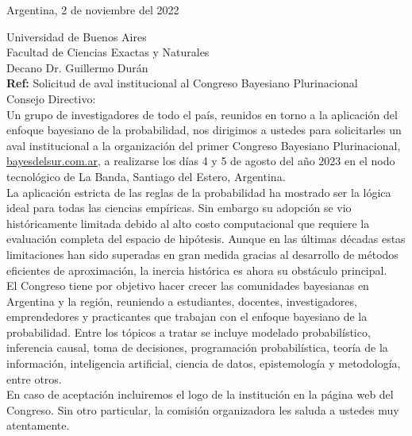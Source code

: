 \documentclass[a4paper,11pt]{article}
\begin{document}
\begin{flushright}
Argentina, 2 de noviembre del 2022
\end{flushright} 

\vspace{0.1cm}
\noindent
Universidad de Buenos Aires \\
Facultad de Ciencias Exactas y Naturales \\
Decano Dr. Guillermo Durán\\[-0.1cm]

\hfill \textbf{Ref:} Solicitud de aval institucional al Congreso Bayesiano Plurinacional \\

\vspace{0.3cm} \noindent Consejo Directivo:\\

\indent Un grupo de investigadores de todo el país, reunidos en torno a la aplicación del enfoque bayesiano de la probabilidad, nos dirigimos a ustedes para solicitarles un aval institucional a la organización del primer Congreso Bayesiano Plurinacional, \url{bayesdelsur.com.ar}, a realizarse los días 4 y 5 de agosto del año 2023 en el nodo tecnológico de La Banda, Santiago del Estero, Argentina. \\

\indent La aplicación estricta de las reglas de la probabilidad ha mostrado ser la lógica ideal para todas las ciencias empíricas.
Sin embargo su adopción se vio históricamente limitada debido al alto costo computacional que requiere la evaluación completa del espacio de hipótesis.
Aunque en las últimas décadas estas limitaciones han sido superadas en gran medida gracias al desarrollo de métodos eficientes de aproximación, la inercia histórica es ahora su obstáculo principal. \\

\indent  El Congreso tiene por objetivo hacer crecer las comunidades bayesianas en Argentina y la región, reuniendo a estudiantes, docentes, investigadores, emprendedores y practicantes que trabajan con el enfoque bayesiano de la probabilidad. Entre los tópicos a tratar se incluye modelado probabilístico, inferencia causal, toma de decisiones, programación probabilística, teoría de la información, inteligencia artificial, ciencia de datos, epistemología y metodología, entre otros. \\

\indent En caso de aceptación incluiremos el logo de la institución en la página web del Congreso. Sin otro particular, la comisión organizadora les saluda a ustedes muy atentamente.\\
\end{document}
